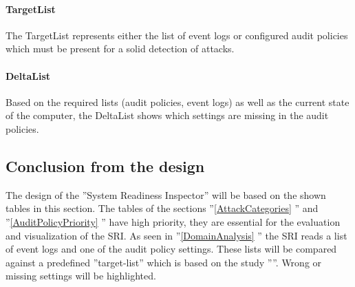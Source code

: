 \paragraph{TargetList}
The TargetList represents either the list of event logs or configured audit policies which must be present for a solid detection of attacks.

\paragraph{DeltaList}
Based on the required lists (audit policies, event logs) as well as the current state of the computer, the DeltaList shows which settings are missing in the audit policies.

\subsection{Conclusion from the design}
The design of the ''System Readiness Inspector'' will be based on the shown tables in this section. The tables of the sections ''\ref{AttackCategories} '' and ''\ref{AuditPolicyPriority} '' have high priority, they are essential for the evaluation and visualization of the SRI. As seen in ''\ref{DomainAnalysis} '' the SRI reads a list of event logs and one of the audit policy settings. These lists will be compared against a predefined ''target-list'' which is based on the study ''''. Wrong or missing settings will be highlighted.